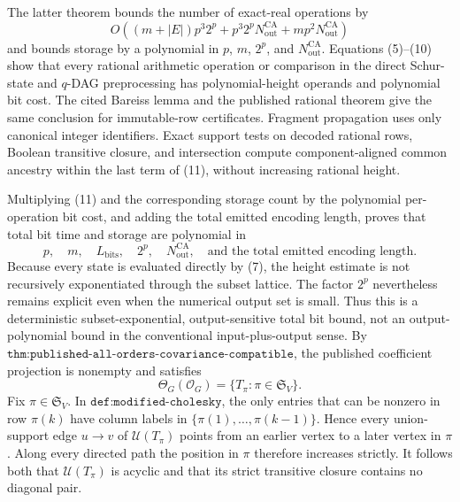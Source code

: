 The latter theorem bounds the number of exact-real operations by
\[
 O\!\left((m+|E|)p^3 2^p
 +p^3 2^pN_{\mathrm{out}}^{\mathrm{CA}}
 +mp^2N_{\mathrm{out}}^{\mathrm{CA}}\right)
\tag{11}
\]
and bounds storage by a polynomial in \(p\), \(m\), \(2^p\), and \(N_{\mathrm{out}}^{\mathrm{CA}}\).  Equations (5)--(10) show that every rational arithmetic operation or comparison in the direct Schur-state and \(q\)-DAG preprocessing has polynomial-height operands and polynomial bit cost.  The cited Bareiss lemma and the published rational theorem give the same conclusion for immutable-row certificates.  Fragment propagation uses only canonical integer identifiers.  Exact support tests on decoded rational rows, Boolean transitive closure, and intersection compute component-aligned common ancestry within the last term of (11), without increasing rational height.

Multiplying (11) and the corresponding storage count by the polynomial per-operation bit cost, and adding the total emitted encoding length, proves that total bit time and storage are polynomial in
\[
 p,\quad m,\quad L_{\mathrm{bits}},\quad 2^p,
 \quad N_{\mathrm{out}}^{\mathrm{CA}},\quad
 \text{and the total emitted encoding length}.
\]
Because every state is evaluated directly by (7), the height estimate is not recursively exponentiated through the subset lattice.  The factor \(2^p\) nevertheless remains explicit even when the numerical output set is small.  Thus this is a deterministic subset-exponential, output-sensitive total bit bound, not an output-polynomial bound in the conventional input-plus-output sense.
By \(\texttt{thm:published-all-orders-covariance-compatible}\), the published coefficient projection is nonempty and satisfies
\[
 \Theta_G(\mathcal O_G)=\{T_\pi:\pi\in\mathfrak S_V\}.
\tag{12}
\]
Fix \(\pi\in\mathfrak S_V\).  In \(\texttt{def:modified-cholesky}\), the only entries that can be nonzero in row \(\pi(k)\) have column labels in \(\{\pi(1),\ldots,\pi(k-1)\}\).  Hence every union-support edge \(u\to v\) of \(\mathcal U(T_\pi)\) points from an earlier vertex to a later vertex in \(\pi\).  Along every directed path the position in \(\pi\) therefore increases strictly.  It follows both that \(\mathcal U(T_\pi)\) is acyclic and that its strict transitive closure contains no diagonal pair.

